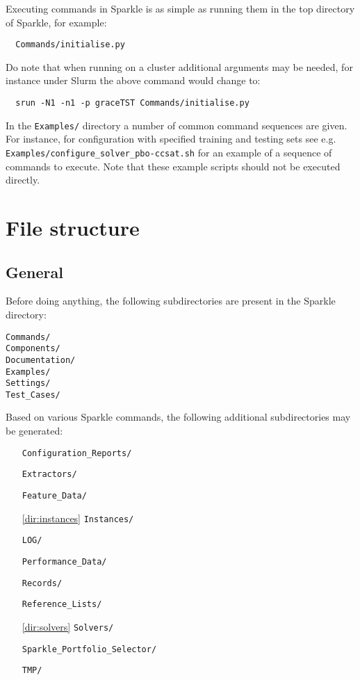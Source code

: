 \documentclass{article}
\begin{document}
Executing commands in Sparkle is as simple as running them in the top directory of Sparkle, for example:

\begin{verbatim}
  Commands/initialise.py
\end{verbatim}

Do note that when running on a cluster additional arguments may be needed, for instance under Slurm the above command would change to:

\begin{verbatim}
  srun -N1 -n1 -p graceTST Commands/initialise.py
\end{verbatim}

In the \texttt{Examples/} directory a number of common command sequences are given. For instance, for configuration with specified training and testing sets see e.g. \texttt{Examples/configure\_solver\_pbo-ccsat.sh} for an example of a sequence of commands to execute. Note that these example scripts should not be executed directly.

\section{File structure}

\subsection{General}
Before doing anything, the following subdirectories are present in the Sparkle directory:

\begin{verbatim}
Commands/
Components/
Documentation/
Examples/
Settings/
Test_Cases/
\end{verbatim}

Based on various Sparkle commands, the following additional subdirectories may be generated:

\begin{itemize}[noitemsep]
  \item[] \texttt{Configuration\_Reports/}
  \item[] \texttt{Extractors/}
  \item[] \texttt{Feature\_Data/}
  \item[\ref{dir:instances}] \texttt{Instances/}
  \item[] \texttt{LOG/}
  \item[] \texttt{Performance\_Data/}
  \item[] \texttt{Records/}
  \item[] \texttt{Reference\_Lists/}
  \item[\ref{dir:solvers}] \texttt{Solvers/}
  \item[] \texttt{Sparkle\_Portfolio\_Selector/}
  \item[] \texttt{TMP/}
\end{itemize}
\end{document}
